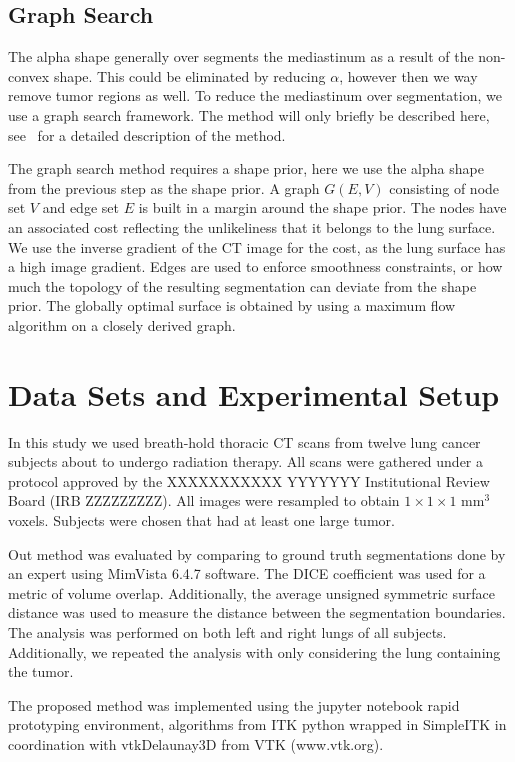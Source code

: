 \documentclass{llncs}
\begin{document}
\subsection{Graph Search}
%
The alpha shape generally over segments the mediastinum as a result of the non-convex shape. This could be eliminated by reducing $\alpha$, however then we way remove tumor regions as well. To reduce the mediastinum over segmentation, we use a graph search framework. The method will only briefly be described here, see~\cite{li2006} for a detailed description of the method. 

The graph search method requires a shape prior, here we use the alpha shape from the previous step as the shape prior. A graph $G(E,V)$ consisting of node set $V$ and edge set $E$ is built in a margin around the shape prior. The nodes have an associated cost reflecting the unlikeliness that it belongs to the lung surface. We use the inverse gradient of the CT image for the cost, as the lung surface has a high image gradient. Edges are used to enforce smoothness constraints, or how much the topology of the resulting segmentation can deviate from the shape prior. The globally optimal surface is obtained by using a maximum flow algorithm on a closely derived graph. 
 

%
\section{Data Sets and Experimental Setup}
%
In this study we used breath-hold thoracic CT scans from twelve lung cancer subjects about to undergo radiation therapy. All scans were gathered under a protocol approved by the 
XXXXXXXXXXX YYYYYYY 
Institutional Review Board 
(IRB ZZZZZZZZZ).
All images were resampled to obtain $1\times{}1\times{}1$ mm$^3$ voxels. Subjects were chosen that had at least one large tumor. 

Out method was evaluated by comparing to ground truth segmentations done by an expert using MimVista 6.4.7 software. The DICE coefficient was used for a metric of volume overlap. Additionally, the average unsigned symmetric surface distance was used to measure the distance between the segmentation boundaries. The analysis was performed on both left and right lungs of all subjects. Additionally, we repeated the analysis with only considering the lung containing the tumor.


The proposed method was implemented using the jupyter notebook \cite{PER-GRA:2007} rapid prototyping environment,  algorithms from ITK\cite{johnson2015itk} python wrapped in SimpleITK \cite{10.3389/fninf.2013.00045} in coordination with vtkDelaunay3D from VTK (www.vtk.org).
\end{document}
